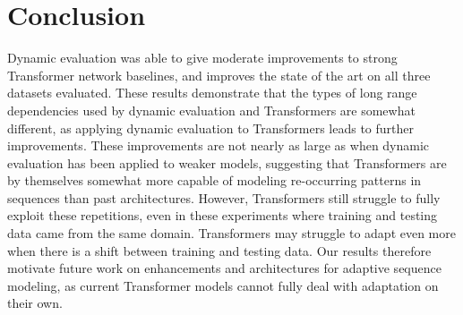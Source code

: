 \documentclass{article} \usepackage{iclr2018_conference,times}
\begin{document}
\section{Conclusion}

Dynamic evaluation was able to give moderate improvements to strong Transformer network baselines, and improves the state of the art on all three datasets evaluated. These results demonstrate that the types of long range dependencies used by dynamic evaluation and Transformers are somewhat different, as applying dynamic evaluation to Transformers leads to further improvements. These improvements are not nearly as large as when dynamic evaluation has been applied to weaker models, suggesting that Transformers are by themselves somewhat more capable of modeling re-occurring patterns in sequences than past architectures. However, Transformers still struggle to fully exploit these repetitions, even in these experiments where training and testing data came from the same domain. Transformers may struggle to adapt even more when there is a shift between training and testing data. Our results therefore motivate future work on enhancements and architectures for adaptive sequence modeling, as current Transformer models cannot fully deal with adaptation on their own.





\end{document}
